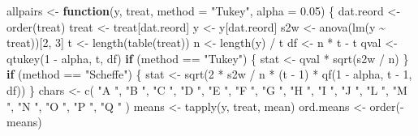 \documentclass[
]{book}
\newenvironment{Shaded}{\begin{snugshade}}{\end{snugshade}}
\newcommand{\AttributeTok}[1]{\textcolor[rgb]{0.77,0.63,0.00}{#1}}
\newcommand{\ControlFlowTok}[1]{\textcolor[rgb]{0.13,0.29,0.53}{\textbf{#1}}}
\newcommand{\DecValTok}[1]{\textcolor[rgb]{0.00,0.00,0.81}{#1}}
\newcommand{\FloatTok}[1]{\textcolor[rgb]{0.00,0.00,0.81}{#1}}
\newcommand{\FunctionTok}[1]{\textcolor[rgb]{0.00,0.00,0.00}{#1}}
\newcommand{\NormalTok}[1]{#1}
\newcommand{\OtherTok}[1]{\textcolor[rgb]{0.56,0.35,0.01}{#1}}
\newcommand{\SpecialCharTok}[1]{\textcolor[rgb]{0.00,0.00,0.00}{#1}}
\newcommand{\StringTok}[1]{\textcolor[rgb]{0.31,0.60,0.02}{#1}}
\begin{document}
\begin{Shaded}
\begin{Highlighting}[]
\NormalTok{allpairs }\OtherTok{\textless{}{-}} \ControlFlowTok{function}\NormalTok{(y, treat, }\AttributeTok{method =} \StringTok{"Tukey"}\NormalTok{, }\AttributeTok{alpha =} \FloatTok{0.05}\NormalTok{) \{}
\NormalTok{  dat.reord }\OtherTok{\textless{}{-}} \FunctionTok{order}\NormalTok{(treat)}
\NormalTok{  treat }\OtherTok{\textless{}{-}}\NormalTok{ treat[dat.reord]}
\NormalTok{  y }\OtherTok{\textless{}{-}}\NormalTok{ y[dat.reord]}
\NormalTok{  s2w }\OtherTok{\textless{}{-}} \FunctionTok{anova}\NormalTok{(}\FunctionTok{lm}\NormalTok{(y }\SpecialCharTok{\textasciitilde{}}\NormalTok{ treat))[}\DecValTok{2}\NormalTok{, }\DecValTok{3}\NormalTok{]}
\NormalTok{  t }\OtherTok{\textless{}{-}} \FunctionTok{length}\NormalTok{(}\FunctionTok{table}\NormalTok{(treat))}
\NormalTok{  n }\OtherTok{\textless{}{-}} \FunctionTok{length}\NormalTok{(y) }\SpecialCharTok{/}\NormalTok{ t}
\NormalTok{  df }\OtherTok{\textless{}{-}}\NormalTok{ n }\SpecialCharTok{*}\NormalTok{ t }\SpecialCharTok{{-}}\NormalTok{ t}
\NormalTok{  qval }\OtherTok{\textless{}{-}} \FunctionTok{qtukey}\NormalTok{(}\DecValTok{1} \SpecialCharTok{{-}}\NormalTok{ alpha, t, df)}
  \ControlFlowTok{if}\NormalTok{ (method }\SpecialCharTok{==} \StringTok{"Tukey"}\NormalTok{) \{}
\NormalTok{    stat }\OtherTok{\textless{}{-}}\NormalTok{ qval }\SpecialCharTok{*} \FunctionTok{sqrt}\NormalTok{(s2w }\SpecialCharTok{/}\NormalTok{ n)}
\NormalTok{  \}}
  \ControlFlowTok{if}\NormalTok{ (method }\SpecialCharTok{==} \StringTok{"Scheffe"}\NormalTok{) \{}
\NormalTok{    stat }\OtherTok{\textless{}{-}}
      \FunctionTok{sqrt}\NormalTok{(}\DecValTok{2} \SpecialCharTok{*}\NormalTok{ s2w }\SpecialCharTok{/}\NormalTok{ n }\SpecialCharTok{*}\NormalTok{ (t }\SpecialCharTok{{-}} \DecValTok{1}\NormalTok{) }\SpecialCharTok{*} \FunctionTok{qf}\NormalTok{(}\DecValTok{1} \SpecialCharTok{{-}}\NormalTok{ alpha, t }\SpecialCharTok{{-}} \DecValTok{1}\NormalTok{, df))}
\NormalTok{  \}}
\NormalTok{  chars }\OtherTok{\textless{}{-}} \FunctionTok{c}\NormalTok{(}
    \StringTok{"A "}\NormalTok{, }\StringTok{"B "}\NormalTok{, }\StringTok{"C "}\NormalTok{, }\StringTok{"D "}\NormalTok{, }\StringTok{"E "}\NormalTok{, }\StringTok{"F "}\NormalTok{, }\StringTok{"G "}\NormalTok{, }\StringTok{"H "}\NormalTok{,}
    \StringTok{"I "}\NormalTok{, }\StringTok{"J "}\NormalTok{, }\StringTok{"L "}\NormalTok{, }\StringTok{"M "}\NormalTok{, }\StringTok{"N "}\NormalTok{, }\StringTok{"O "}\NormalTok{, }\StringTok{"P "}\NormalTok{, }\StringTok{"Q "}
\NormalTok{  )}
\NormalTok{  means }\OtherTok{\textless{}{-}} \FunctionTok{tapply}\NormalTok{(y, treat, mean)}
\NormalTok{  ord.means }\OtherTok{\textless{}{-}} \FunctionTok{order}\NormalTok{(}\SpecialCharTok{{-}}\NormalTok{means)}

\end{Highlighting}
\end{Shaded}
\end{document}
